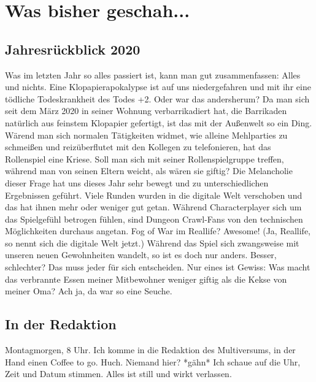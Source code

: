 \documentclass[final]{multiversum}
\begin{document}
\makemultititle
%

\section{Was bisher geschah...}

\subsection{Jahresrückblick 2020}
Was im letzten Jahr so alles passiert ist, kann man gut zusammenfassen: Alles und nichts.
Eine Klopapierapokalypse ist auf uns niedergefahren und mit ihr eine tödliche Todeskrankheit des Todes +2.
Oder war das andersherum?
Da man sich seit dem März 2020 in seiner Wohnung verbarrikadiert hat, die Barrikaden natürlich aus feinstem Klopapier gefertigt, ist das mit der Außenwelt so ein Ding.
Wärend man sich normalen Tätigkeiten widmet, wie alleine Mehlparties zu schmeißen und reizüberflutet mit den Kollegen zu telefonieren, hat das Rollenspiel eine Kriese.
Soll man sich mit seiner Rollenspielgruppe treffen, während man von seinen Eltern weicht, als wären sie giftig?
Die Melancholie dieser Frage hat uns dieses Jahr sehr bewegt und zu unterschiedlichen Ergebnissen geführt.
Viele Runden wurden in die digitale Welt verschoben und das hat ihnen mehr oder weniger gut getan.
Während Characterplayer sich um das Spielgefühl betrogen fühlen, sind Dungeon Crawl-Fans von den technischen Möglichkeiten durchaus angetan.
Fog of War im Reallife? Awesome! (Ja, Reallife, so nennt sich die digitale Welt jetzt.)
Während das Spiel sich zwangsweise mit unseren neuen Gewohnheiten wandelt, so ist es doch nur anders.
Besser, schlechter? Das muss jeder für sich entscheiden.
Nur eines ist Gewiss:
Was macht das verbrannte Essen meiner Mitbewohner weniger giftig als die Kekse von meiner Oma?
Ach ja, da war so eine Seuche.

\subsection{In der Redaktion}
Montagmorgen, 8 Uhr.
Ich komme in die Redaktion des Multiversums, in der Hand einen Coffee to go.
Huch. Niemand hier? *gähn*
Ich schaue auf die Uhr, Zeit und Datum stimmen.
Alles ist still und wirkt verlassen.
\end{document}

